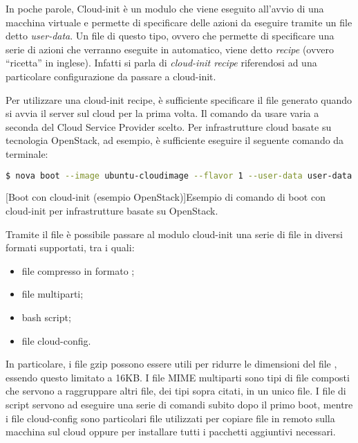            In poche parole, Cloud-init è un modulo che viene eseguito all'avvio di una macchina virtuale e permette di specificare delle azioni da eseguire tramite un file detto \textit{user-data}. Un file di questo tipo, ovvero che permette di specificare una serie di azioni che verranno eseguite in automatico, viene detto \textit{recipe} (ovvero ``ricetta'' in inglese). Infatti si parla di \textit{cloud-init recipe} riferendosi ad una particolare configurazione da passare a cloud-init.
            
            Per utilizzare una cloud-init recipe, è sufficiente specificare il file  generato quando si avvia il server sul cloud per la prima volta. Il comando da usare varia a seconda del Cloud Service Provider scelto. Per infrastrutture cloud basate su tecnologia OpenStack, ad esempio, è sufficiente eseguire il seguente comando da terminale:
            
            \begin{center}
                \begin{lstlisting}[language=bash, gobble=18]
                    $ nova boot --image ubuntu-cloudimage --flavor 1 --user-data user-data
                \end{lstlisting}
                \captionsetup{textformat=empty,labelformat=empty} \vspace{-2em}
                [Boot con cloud-init (esempio OpenStack)]{Esempio di comando di boot con cloud-init per infrastrutture basate su OpenStack.}
            \end{center}
            
            Tramite il file  è possibile passare al modulo cloud-init una serie di file in diversi formati supportati, tra i quali:
            
            \begin{itemize}
                \item file compresso in formato ;
                \item file  multiparti;
                \item bash script;
                \item file cloud-config.
            \end{itemize}
            
            In particolare, i file gzip possono essere utili per ridurre le dimensioni del file , essendo questo limitato a 16KB. I file \ac{MIME} multiparti sono tipi di file composti che servono a raggruppare altri file, dei tipi sopra citati, in un unico file. I file di script servono ad eseguire una serie di comandi subito dopo il primo boot, mentre i file cloud-config sono particolari file utilizzati per copiare file in remoto sulla macchina sul cloud oppure per installare tutti i pacchetti aggiuntivi necessari.
            
